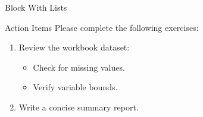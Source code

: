 \documentclass[14pt,t]{beamer-accessibility}
\begin{document}
\begin{frame}{Block With Lists}
\begin{block}{Action Items}
Please complete the following exercises:
\begin{enumerate}
\item Review the workbook dataset:
  \begin{itemize}
  \item Check for missing values.
  \item Verify variable bounds.
  \end{itemize}
\item Write a concise summary report.
\end{enumerate}
\end{block}
\end{frame}
\end{document}

